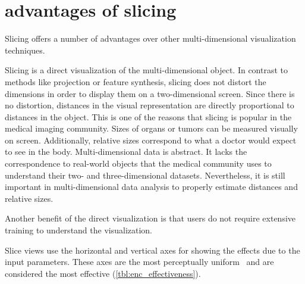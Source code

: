 \section{advantages of slicing}
\label{sec:slicing-advantages}

Slicing offers a number of advantages over other multi-dimensional
visualization techniques. 

Slicing is a direct visualization of the multi-dimensional object. In contrast
to methods like projection or feature synthesis, slicing does not distort the
dimensions in order to display them on a two-dimensional screen. Since there is
no distortion, distances in the visual representation are directly proportional
to distances in the object. This is one of the reasons that slicing is popular
in the medical imaging community. Sizes of organs or tumors can be measured
visually on screen. Additionally, relative sizes correspond to what a doctor
would expect to see in the body. Multi-dimensional data is abstract. It lacks
the correspondence to real-world objects that the medical community uses to
understand their two- and three-dimensional datasets.  Nevertheless, it is
still important in multi-dimensional data analysis to properly estimate
distances and relative sizes. 

Another benefit of the direct visualization is that users do not require
extensive training to understand the visualization.  

Slice views use the horizontal and vertical axes for showing the effects due to
the input parameters. These axes are the most perceptually uniform~\cite{ref}
and are considered the most effective (\autoref{tbl:enc_effectiveness}).







